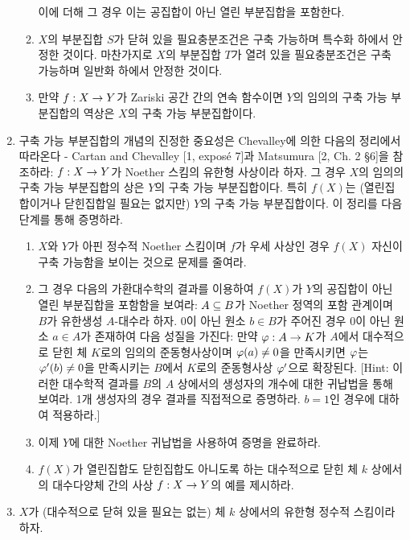 \begin{enumerate}[label=\tb{3.\arabic*.},itemindent=0mm,itemsep=4mm]
\begin{enumerate}[label=(\alph*)]
	이에 더해 그 경우 이는 공집합이 아닌 열린 부분집합을 포함한다.
	\item $X$의 부분집합 $S$가 닫혀 있을 필요충분조건은 구축 가능하며 특수화 하에서 안정한 것이다.
	마찬가지로 $X$의 부분집합 $T$가 열려 있을 필요충분조건은 구축 가능하며 일반화 하에서 안정한 것이다.
	\item 만약 $f:X\rightarrow Y$가 Zariski 공간 간의 연속 함수이면 $Y$의 임의의 구축 가능 부분집합의 역상은 $X$의 구축 가능 부분집합이다.
	\end{enumerate}
	\sol
	\item 구축 가능 부분집합의 개념의 진정한 중요성은 Chevalley에 의한 다음의 정리에서 따라온다 - 
	Cartan and Chevalley [1, expos\'e 7]과 Matsumura [2, Ch. 2 \S 6]을 참조하라:
	$f:X\rightarrow Y$가 Noether 스킴의 유한형 사상이라 하자. 그 경우 $X$의 임의의 구축 가능 부분집합의 상은 $Y$의 구축 가능 부분집합이다.
	특히 $f(X)$는 (열린집합이거나 닫힌집합일 필요는 없지만) $Y$의 구축 가능 부분집합이다. 이 정리를 다음 단계를 통해 증명하라.
	\begin{enumerate}[label=(\alph*)]
	\item $X$와 $Y$가 아핀 정수적 Noether 스킴이며 $f$가 우세 사상인 경우 $f(X)$ 자신이 구축 가능함을 보이는 것으로 문제를 줄여라.
	\end{enumerate}
	\begin{enumerate}[label=*(\alph*)]
	\setcounter{enumii}{1}
	\item 그 경우 다음의 가환대수학의 결과를 이용하여 $f(X)$가 $Y$의 공집합이 아닌 열린 부분집합을 포함함을 보여라:
	$A\subseteq B$가 Noether 정역의 포함 관계이며 $B$가 유한생성 $A$-대수라 하자.
	0이 아닌 원소 $b\in B$가 주어진 경우 0이 아닌 원소 $a\in A$가 존재하여 다음 성질을 가진다:
	만약 $\varphi:A\rightarrow K$가 $A$에서 대수적으로 닫힌 체 $K$로의 임의의 준동형사상이며 $\varphi(a)\ne 0$을 만족시키면
	$\varphi$는 $\varphi'(b)\ne 0$을 만족시키는 $B$에서 $K$로의 준동형사상 $\varphi'$으로 확장된다.
	[Hint: 이러한 대수학적 결과를 $B$의 $A$ 상에서의 생성자의 개수에 대한 귀납법을 통해 보여라.
	1개 생성자의 경우 결과를 직접적으로 증명하라. $b=1$인 경우에 대하여 적용하라.]
	\end{enumerate}
	\begin{enumerate}[label=(\alph*)]
	\setcounter{enumii}{2}
	\item 이제 $Y$에 대한 Noether 귀납법을 사용하여 증명을 완료하라.
	\item $f(X)$가 열린집합도 닫힌집합도 아니도록 하는 대수적으로 닫힌 체 $k$ 상에서의 대수다양체 간의 사상 $f:X\rightarrow Y$의 예를 제시하라.
	\end{enumerate}
	\sol
	\item {} $X$가 (대수적으로 닫혀 있을 필요는 없는) 체 $k$ 상에서의 유한형 정수적 스킴이라 하자.

\end{enumerate}
